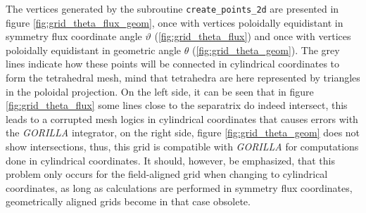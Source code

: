 \documentclass[./main.tex]{subfiles}
\begin{document}
The vertices generated by the subroutine \texttt{create\_points\_2d} are presented in figure \ref{fig:grid_theta_flux_geom}, once with vertices poloidally equidistant in symmetry flux coordinate angle $\vartheta$ (\ref{fig:grid_theta_flux}) and once with vertices poloidally equidistant in geometric angle $\theta$ (\ref{fig:grid_theta_geom}). The grey lines indicate how these points will be connected in cylindrical coordinates to form the tetrahedral mesh, mind that tetrahedra are here represented by triangles in the poloidal projection. On the left side, it can be seen that in figure \ref{fig:grid_theta_flux} some lines close to the separatrix do indeed intersect, this leads to a corrupted mesh logics in cylindrical coordinates that causes errors with the \textit{GORILLA} integrator, on the right side, figure \ref{fig:grid_theta_geom} does not show intersections, thus, this grid is compatible with \textit{GORILLA} for computations done in cylindrical coordinates. It should, however, be emphasized, that this problem only occurs for the field-aligned grid when changing to cylindrical coordinates, as long as calculations are performed in symmetry flux coordinates, geometrically aligned grids become in that case obsolete.
\end{document}
